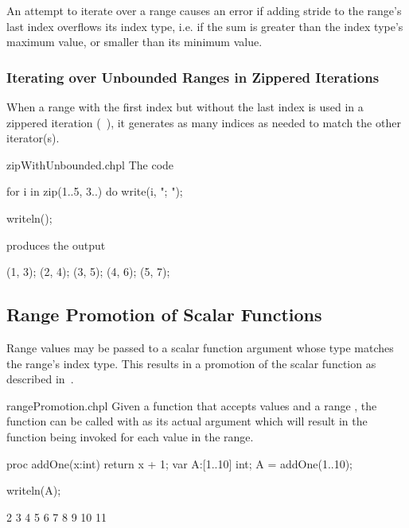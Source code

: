 \begin{craychapel}
An attempt to iterate over a range causes an error if adding stride to
the range's last index overflows its index type, i.e. if the sum is
greater than the index type's maximum value, or smaller than its
minimum value.
\end{craychapel}

\subsubsection{Iterating over Unbounded Ranges in Zippered Iterations}
\label{Iterating_over_Unbounded_Ranges_in_Zippered_Iterations}

When a range with the first index but without the last index is used
in a zippered iteration (~),
it generates as many indices as needed
to match the other iterator(s).

\begin{chapelexample}{zipWithUnbounded.chpl}
The code
\begin{chapel}
for i in zip(1..5, 3..) do
  write(i, "; ");
\end{chapel}
\begin{chapelpost}
writeln();
\end{chapelpost}
produces the output 
\begin{chapelprintoutput}
(1, 3); (2, 4); (3, 5); (4, 6); (5, 7); 
\end{chapelprintoutput}
\end{chapelexample}

\subsection{Range Promotion of Scalar Functions}
\label{Range_Promotion_of_Scalar_Functions}

Range values may be passed to a scalar function argument whose type
matches the range's index type.  This results in a promotion of the
scalar function as described in~.

\begin{chapelexample}{rangePromotion.chpl}
Given a function  that accepts  values and
a range , the function  can be called with
 as its actual argument which will result in the function
being invoked for each value in the range.

\begin{chapel}
proc addOne(x:int) {
  return x + 1;
}
var A:[1..10] int;
A = addOne(1..10);
\end{chapel}
\begin{chapelpost}
writeln(A);
\end{chapelpost}
\begin{chapeloutput}
2 3 4 5 6 7 8 9 10 11
\end{chapeloutput}

\end{chapelexample}

